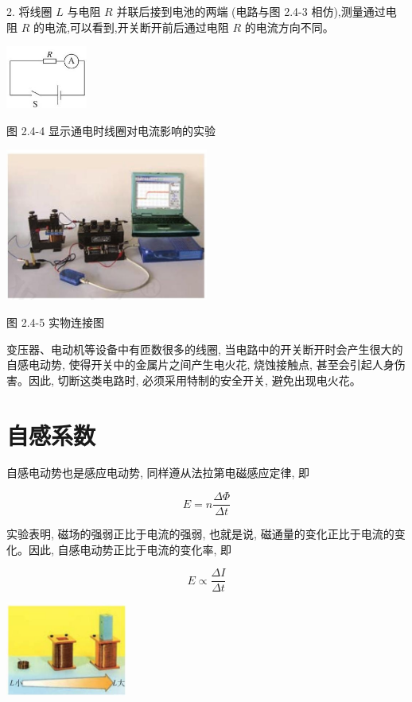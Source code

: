\documentclass[10pt]{article}
\begin{document}
2. 将线圈 \(L\) 与电阻 \(R\) 并联后接到电池的两端 (电路与图 2.4-3 相仿),测量通过电阻 \(R\) 的电流,可以看到,开关断开前后通过电阻 \(R\) 的电流方向不同。

\begin{center}
\includegraphics[max width=0.2\textwidth]{images/01910e72-c5b7-7ed5-a6d4-fb3a5faefc32_47_970551.jpg}
\end{center}

图 2.4-4 显示通电时线圈对电流影响的实验

\begin{center}
\includegraphics[max width=0.5\textwidth]{images/01910e72-c5b7-7ed5-a6d4-fb3a5faefc32_47_140871.jpg}
\end{center}

图 2.4-5 实物连接图

变压器、电动机等设备中有匝数很多的线圈, 当电路中的开关断开时会产生很大的自感电动势, 使得开关中的金属片之间产生电火花, 烧蚀接触点, 甚至会引起人身伤害。因此, 切断这类电路时, 必须采用特制的安全开关, 避免出现电火花。

\section*{自感系数}

自感电动势也是感应电动势, 同样遵从法拉第电磁感应定律, 即

\[
E = n\frac{\Delta \Phi }{\Delta t}
\]

实验表明, 磁场的强弱正比于电流的强弱, 也就是说, 磁通量的变化正比于电流的变化。因此, 自感电动势正比于电流的变化率, 即

\[
E \propto \frac{\Delta I}{\Delta t}
\]

\begin{center}
\includegraphics[max width=0.3\textwidth]{images/01910e72-c5b7-7ed5-a6d4-fb3a5faefc32_48_748378.jpg}
\end{center}
\end{document}
